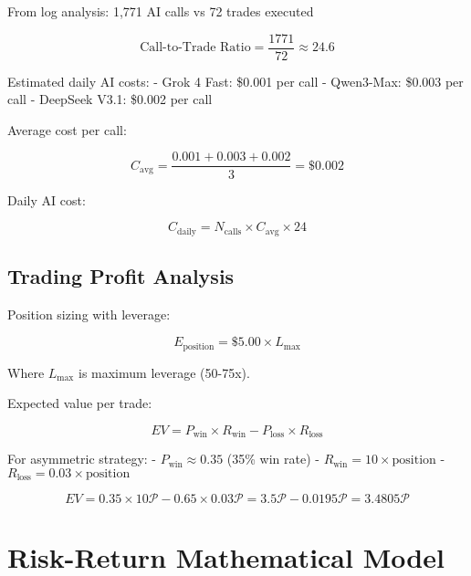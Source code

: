 \documentclass{article}
\begin{document}
From log analysis: 1,771 AI calls vs 72 trades executed

\begin{equation}
\text{Call-to-Trade Ratio} = \frac{1771}{72} \approx 24.6
\end{equation}

Estimated daily AI costs:
- Grok 4 Fast: \$0.001 per call
- Qwen3-Max: \$0.003 per call
- DeepSeek V3.1: \$0.002 per call

Average cost per call:

\begin{equation}
C_{\text{avg}} = \frac{0.001 + 0.003 + 0.002}{3} = \$0.002
\end{equation}

Daily AI cost:

\begin{equation}
C_{\text{daily}} = N_{\text{calls}} \times C_{\text{avg}} \times 24
\end{equation}

\subsection{Trading Profit Analysis}

Position sizing with leverage:

\begin{equation}
E_{\text{position}} = \$5.00 \times L_{\text{max}}
\end{equation}

Where $L_{\text{max}}$ is maximum leverage (50-75x).

Expected value per trade:

\begin{equation}
EV = P_{\text{win}} \times R_{\text{win}} - P_{\text{loss}} \times R_{\text{loss}}
\end{equation}

For asymmetric strategy:
- $P_{\text{win}} \approx 0.35$ (35\% win rate)
- $R_{\text{win}} = 10 \times \text{position}$
- $R_{\text{loss}} = 0.03 \times \text{position}$

\begin{equation}
EV = 0.35 \times 10\mathcal{P} - 0.65 \times 0.03\mathcal{P} = 3.5\mathcal{P} - 0.0195\mathcal{P} = 3.4805\mathcal{P}
\end{equation}

\section{Risk-Return Mathematical Model}
\end{document}
